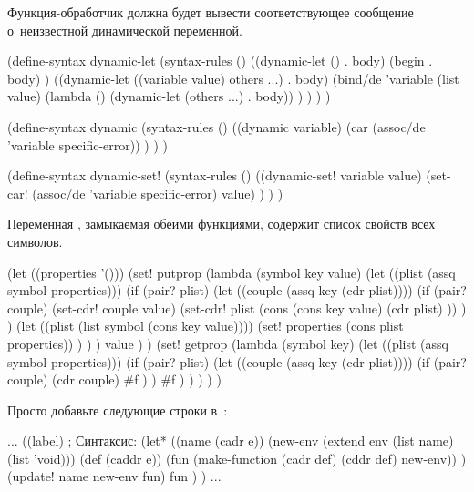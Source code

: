 
Функция-обработчик  должна будет вывести соответствующее
сообщение о~неизвестной динамической переменной.

\begin{code:lisp}
(define-syntax dynamic-let
  (syntax-rules ()
    ((dynamic-let () . body)
     (begin . body) )
    ((dynamic-let ((variable value) others ...) . body)
     (bind/de 'variable (list value)
              (lambda () (dynamic-let (others ...) . body)) ) ) ) )

(define-syntax dynamic
  (syntax-rules ()
    ((dynamic variable)
     (car (assoc/de 'variable specific-error)) ) ) )

(define-syntax dynamic-set!
  (syntax-rules ()
    ((dynamic-set! variable value)
     (set-car! (assoc/de 'variable specific-error) value) ) ) )
\end{code:lisp}



Переменная , замыкаемая обеими функциями, содержит список свойств
всех символов.

\begin{code:lisp}
(let ((properties '()))
  (set! putprop
        (lambda (symbol key value)
          (let ((plist (assq symbol properties)))
            (if (pair? plist)
                (let ((couple (assq key (cdr plist))))
                  (if (pair? couple)
                      (set-cdr! couple value)
                      (set-cdr! plist (cons (cons key value)
                                            (cdr plist) )) ) )
                (let ((plist (list symbol (cons key value))))
                  (set! properties (cons plist properties)) ) ) )
          value ) )
  (set! getprop
        (lambda (symbol key)
          (let ((plist (assq symbol properties)))
            (if (pair? plist)
                (let ((couple (assq key (cdr plist))))
                  (if (pair? couple)
                      (cdr couple)
                      #f ) )
                #f ) ) ) ) )
\end{code:lisp}



Просто добавьте следующие строки в~:

\begin{code:lisp}
...
((label)  ; Синтаксис: 
 (let* ((name    (cadr e))
        (new-env (extend env (list name) (list 'void)))
        (def     (caddr e))
        (fun     (make-function (cadr def) (cddr def) new-env)) )
   (update! name new-env fun)
   fun ) )
...
\end{code:lisp}



